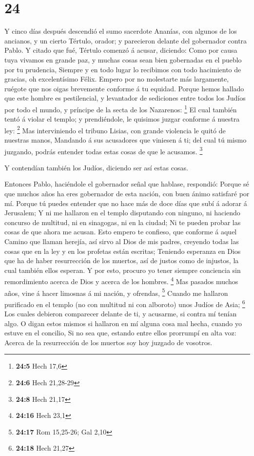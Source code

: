 \hypertarget{section-23}{%
\section{24}\label{section-23}}

 Y cinco días después descendió el sumo sacerdote Ananías,
con algunos de los ancianos, y un cierto Tértulo, orador; y parecieron
delante del gobernador contra Pablo.  Y citado que fué,
Tértulo comenzó á acusar, diciendo: Como por causa tuya vivamos en
grande paz, y muchas cosas sean bien gobernadas en el pueblo por tu
prudencia,  Siempre y en todo lugar lo recibimos con todo
hacimiento de gracias, oh excelentísimo Félix.  Empero por
no molestarte más largamente, ruégote que nos oigas brevemente conforme
á tu equidad.  Porque hemos hallado que este hombre es
pestilencial, y levantador de sediciones entre todos los Judíos por todo
el mundo, y príncipe de la secta de los Nazarenos: \footnote{\textbf{24:5}
  Hech 17,6}  El cual también tentó á violar el templo; y
prendiéndole, le quisimos juzgar conforme á nuestra ley: \footnote{\textbf{24:6}
  Hech 21,28-29}  Mas interviniendo el tribuno Lisias, con
grande violencia le quitó de nuestras manos,  Mandando á sus
acusadores que viniesen á ti; del cual tú mismo juzgando, podrás
entender todas estas cosas de que le acusamos. \footnote{\textbf{24:8}
  Hech 21,17}

 Y contendían también los Judíos, diciendo ser así estas
cosas.

 Entonces Pablo, haciéndole el gobernador señal que
hablase, respondió: Porque sé que muchos años ha eres gobernador de esta
nación, con buen ánimo satisfaré por mí.  Porque tú puedes
entender que no hace más de doce días que subí á adorar á Jerusalem;
 Y ni me hallaron en el templo disputando con ninguno, ni
haciendo concurso de multitud, ni en sinagogas, ni en la ciudad;
 Ni te pueden probar las cosas de que ahora me acusan.
 Esto empero te confieso, que conforme á aquel Camino que
llaman herejía, así sirvo al Dios de mis padres, creyendo todas las
cosas que en la ley y en los profetas están escritas; 
Teniendo esperanza en Dios que ha de haber resurrección de los muertos,
así de justos como de injustos, la cual también ellos esperan.
 Y por esto, procuro yo tener siempre conciencia sin
remordimiento acerca de Dios y acerca de los hombres. \footnote{\textbf{24:16}
  Hech 23,1}  Mas pasados muchos años, vine á hacer
limosnas á mi nación, y ofrendas, \footnote{\textbf{24:17} Rom 15,25-26;
  Gal 2,10}  Cuando me hallaron purificado en el templo (no
con multitud ni con alboroto) unos Judíos de Asia; \footnote{\textbf{24:18}
  Hech 21,27}  Los cuales debieron comparecer delante de
ti, y acusarme, si contra mí tenían algo.  O digan estos
mismos si hallaron en mí alguna cosa mal hecha, cuando yo estuve en el
concilio,  Si no sea que, estando entre ellos prorrumpí en
alta voz: Acerca de la resurrección de los muertos soy hoy juzgado de
vosotros.


